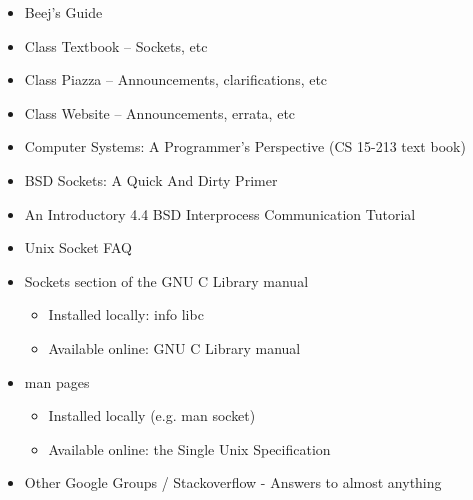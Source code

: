 \begin{itemize}
    \item Beej's Guide~\cite{beej}
	\item Class Textbook -- Sockets, etc
	\item Class Piazza --  Announcements, clarifications, etc
	\item Class Website --  Announcements, errata, etc
	\item Computer Systems: A Programmer's Perspective (CS 15-213 text book)\cite{Book:CSAPP}
	\item BSD Sockets: A Quick And Dirty Primer\cite{BSD:Sockets}
	\item An Introductory 4.4 BSD Interprocess Communication Tutorial\cite{BSD:IPC}
	\item Unix Socket FAQ\cite{FAQ:Sockets}
	\item Sockets section of the GNU C Library manual
		\begin{itemize}
			\item Installed locally: info libc
			\item Available online: GNU C Library manual\cite{Manual:libc}
		\end{itemize}
	\item man pages
		\begin{itemize}
			\item Installed locally (e.g. man socket)
			\item Available online: the Single Unix Specification\cite{Spec:Unix}
		\end{itemize}
	\item Other Google Groups / Stackoverflow - Answers to almost anything\cite{Google:Groups}
\end{itemize}


